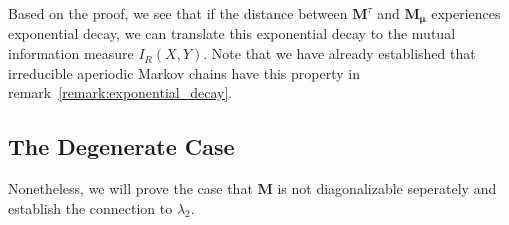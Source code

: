 \documentclass[../../main.tex]{subfiles}
\begin{document}
    \bigskip
    \begin{remark}
        Based on the proof, we see that if the distance between $\bm{M}^\tau$ and $\bm{M_\mu}$ experiences exponential decay, we can translate this exponential decay to the mutual information measure $I_R(X, Y)$. Note that we have already established that irreducible aperiodic Markov chains have this property in remark~\ref{remark:exponential_decay}.
    \end{remark}

\subsection{The Degenerate Case}
    Nonetheless, we will prove the case that $\bm{M}$ is not diagonalizable seperately and establish the connection to $\lambda_2$.
\end{document}
